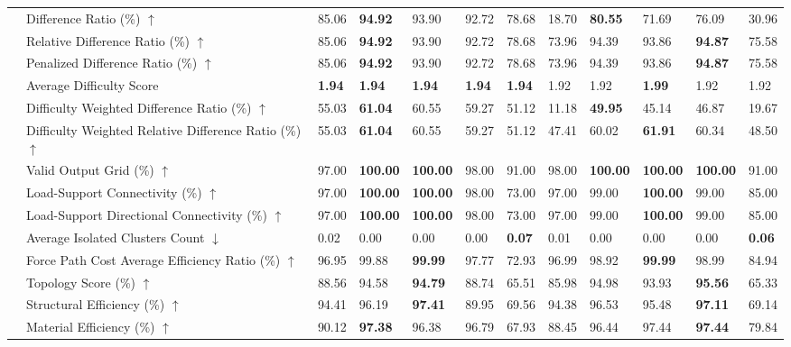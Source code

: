 \begin{table}[!h]
{\begin{tabular}{lllllll|lllll}
 & Difference Ratio (\%) $\uparrow$ & 85.06 & \textbf{94.92} & 93.90 & 92.72 & 78.68 & 18.70 & \textbf{80.55} & 71.69 & 76.09 & 30.96 \\
 & Relative Difference Ratio (\%) $\uparrow$ & 85.06 & \textbf{94.92} & 93.90 & 92.72 & 78.68 & 73.96 & 94.39 & 93.86 & \textbf{94.87} & 75.58 \\
 & Penalized Difference Ratio (\%) $\uparrow$ & 85.06 & \textbf{94.92} & 93.90 & 92.72 & 78.68 & 73.96 & 94.39 & 93.86 & \textbf{94.87} & 75.58 \\
 & Average Difficulty Score & \textbf{1.94} & \textbf{1.94} & \textbf{1.94} & \textbf{1.94} & \textbf{1.94} & 1.92 & 1.92 & \textbf{1.99} & 1.92 & 1.92 \\
 & Difficulty Weighted Difference Ratio (\%) $\uparrow$ & 55.03 & \textbf{61.04} & 60.55 & 59.27 & 51.12 & 11.18 & \textbf{49.95} & 45.14 & 46.87 & 19.67 \\
 & Difficulty Weighted Relative Difference Ratio (\%) $\uparrow$ & 55.03 & \textbf{61.04} & 60.55 & 59.27 & 51.12 & 47.41 & 60.02 & \textbf{61.91} & 60.34 & 48.50 \\
 & Valid Output Grid (\%) $\uparrow$ & 97.00 & \textbf{100.00} & \textbf{100.00} & 98.00 & 91.00 & 98.00 & \textbf{100.00} & \textbf{100.00} & \textbf{100.00} & 91.00 \\
 & Load-Support Connectivity (\%) $\uparrow$ & 97.00 & \textbf{100.00} & \textbf{100.00} & 98.00 & 73.00 & 97.00 & 99.00 & \textbf{100.00} & 99.00 & 85.00 \\
 & Load-Support Directional Connectivity (\%) $\uparrow$ & 97.00 & \textbf{100.00} & \textbf{100.00} & 98.00 & 73.00 & 97.00 & 99.00 & \textbf{100.00} & 99.00 & 85.00 \\
 & Average Isolated Clusters Count $\downarrow$ & 0.02 & 0.00 & 0.00 & 0.00 & \textbf{0.07} & 0.01 & 0.00 & 0.00 & 0.00 & \textbf{0.06} \\
 & Force Path Cost Average Efficiency Ratio (\%) $\uparrow$ & 96.95 & 99.88 & \textbf{99.99} & 97.77 & 72.93 & 96.99 & 98.92 & \textbf{99.99} & 98.99 & 84.94 \\
 & Topology Score (\%) $\uparrow$ & 88.56 & 94.58 & \textbf{94.79} & 88.74 & 65.51 & 85.98 & 94.98 & 93.93 & \textbf{95.56} & 65.33 \\
 & Structural Efficiency (\%) $\uparrow$ & 94.41 & 96.19 & \textbf{97.41} & 89.95 & 69.56 & 94.38 & 96.53 & 95.48 & \textbf{97.11} & 69.14 \\
 & Material Efficiency (\%) $\uparrow$ & 90.12 & \textbf{97.38} & 96.38 & 96.79 & 67.93 & 88.45 & 96.44 & 97.44 & \textbf{97.44} & 79.84 \\

\end{tabular}}
\end{table}

